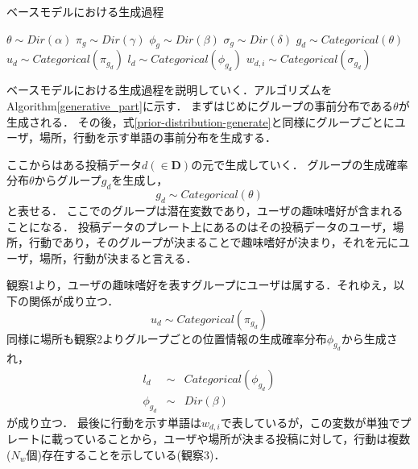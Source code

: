 \documentclass[a4j,10pt, twocolumn]{jarticle}
\begin{document}
\begin{algorithm}[tb]
  \caption{ベースモデルにおける生成過程}\label{generative_part}
  \begin{algorithmic}[1]
    \State $\theta \sim Dir(\alpha)$ 
    \State $\pi_g \sim Dir(\gamma)$ 
    \State $\phi_g \sim Dir(\beta)$ 
    \State $\sigma_g \sim Dir(\delta)$ 
    \EndFor
     
    \State $g_d \sim Categorical(\theta)$ 
    \State $u_d \sim Categorical(\pi_{g_d})$ 
    \State $l_d \sim Categorical(\phi_{g_d})$ 
    \State $w_{d, i} \sim Categorical(\sigma_{g_d})$ 
    \EndFor
    \EndFor
  \end{algorithmic}
\end{algorithm}

ベースモデルにおける生成過程を説明していく．アルゴリズムをAlgorithm\ref{generative_part}に示す．
まずはじめにグループの事前分布である$\theta$が生成される．
その後，式\ref{prior-distribution-generate}と同様にグループごとにユーザ，場所，行動を示す単語の事前分布を生成する．

ここからはある投稿データ$d(\in \bm{D})$の元で生成していく．
グループの生成確率分布$\theta$からグループ$g_d$を生成し，
\begin{equation}
  g_d \sim Categorical(\theta)
\end{equation}
と表せる．
ここでのグループは潜在変数であり，ユーザの趣味嗜好が含まれることになる．
投稿データのプレート上にあるのはその投稿データのユーザ，場所，行動であり，そのグループが決まることで趣味嗜好が決まり，それを元にユーザ，場所，行動が決まると言える．

観察1より，ユーザの趣味嗜好を表すグループにユーザは属する．それゆえ，以下の関係が成り立つ．
\begin{equation}
  u_d \sim Categorical(\pi_{g_d})
\end{equation}
同様に場所も観察2よりグループごとの位置情報の生成確率分布$\phi_{g_d}$から生成され，
\begin{eqnarray*}
  l_d & \sim & Categorical(\phi_{g_d}) \\
  \phi_{g_d} & \sim & Dir(\beta)
\end{eqnarray*}
が成り立つ．
最後に行動を示す単語は$w_{d, i}$で表しているが，この変数が単独でプレートに載っていることから，ユーザや場所が決まる投稿に対して，行動は複数($N_w$個)存在することを示している(観察3)．
\end{document}
